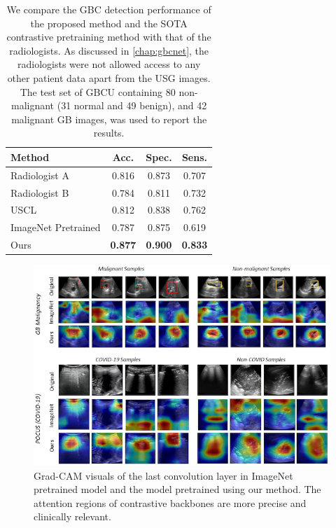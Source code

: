  \begin{table}[!ht]
    \footnotesize
		\centering
		\setlength{\tabcolsep}{10pt}
		\begin{tabular}{lccc}
		\toprule
		\textbf{Method}	& \textbf{Acc.} & \textbf{Spec.} & \textbf{Sens.} \\
		\midrule
		Radiologist A & 0.816 & 0.873 & 0.707  \\
		Radiologist B & 0.784 & 0.811 & 0.732  \\
		\midrule%
		USCL & 0.812 & 0.838 & 0.762 \\
		ImageNet Pretrained & 0.787 & 0.875 & 0.619 \\
		\midrule
		Ours & \textbf{0.877} & \textbf{0.900 }&\textbf{ 0.833} \\
		\bottomrule
		\end{tabular}
        \caption[Comparison with the radiologists]{We compare the GBC detection performance of the proposed method and the SOTA contrastive pretraining method \cite{uscl} with that of the radiologists. As discussed in \cref{chap:gbcnet}, the radiologists were not allowed access to any other patient data apart from the USG images. The test set of GBCU containing 80 non-malignant (31 normal and 49 benign), and 42 malignant GB images, was used to report the results.}
		\label{usucl_tab:perf_human}
\end{table}
%
\begin{figure}[!ht]
    \centering
    \includegraphics[width=\linewidth]{figs/usucl/cam-view.png}
    \caption[Grad-CAM visuals of the models with ImageNet pretraining and our contrastive pretraining]{Grad-CAM visuals of the last convolution layer in ImageNet pretrained model and the model pretrained using our method. The attention regions of contrastive backbones are more precise and clinically relevant.}
    \label{usucl_fig:cam_view}
\end{figure}

